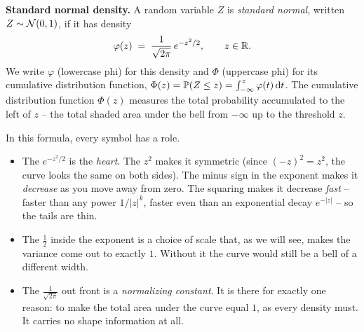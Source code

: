 \begin{formalbox}
\textbf{Standard normal density.} A random variable $Z$ is \emph{standard normal},
written $Z \sim \mathcal{N}(0,1)$, if it has density
\[
  \varphi(z) \;=\; \frac{1}{\sqrt{2\pi}}\, e^{-z^2/2}, \qquad z \in \mathbb{R}.
\]
We write $\varphi$ (lowercase phi) for this density and $\Phi$ (uppercase phi)
for its cumulative distribution function, $\Phi(z) = \operatorname{\mathbb{P}}(Z \le z) = \int_{-\infty}^{z}\varphi(t)\,\mathrm{d} t$.
The cumulative distribution function $\Phi(z)$ measures the total
probability accumulated to the left of $z$ -- the total shaded area under the
bell from $-\infty$ up to the threshold $z$.
\end{formalbox}

In this formula, every symbol has a role.

\begin{itemize}
  \item The $e^{-z^2/2}$ is the \emph{heart}. The $z^2$ makes it symmetric (since
  $(-z)^2 = z^2$, the curve looks the same on both sides). The minus sign in the
  exponent makes it \emph{decrease} as you move away from zero. The squaring makes
  it decrease \emph{fast} -- faster than any power $1/|z|^k$, faster even than an
  exponential decay $e^{-|z|}$ -- so the tails are thin.
  \item The $\tfrac{1}{2}$ inside the exponent is a choice of scale that, as we
  will see, makes the variance come out to exactly $1$. Without it the curve would
  still be a bell of a different width.
  \item The $\tfrac{1}{\sqrt{2\pi}}$ out front is a \emph{normalizing constant}.
  It is there for exactly one reason: to make the total area under the curve equal
  $1$, as every density must. It carries no shape information at all.
\end{itemize}

